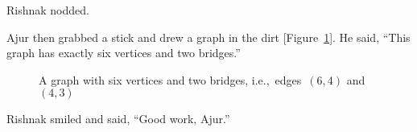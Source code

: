 Rishnak nodded.

Ajur then grabbed a stick and drew a graph in the dirt [Figure~\ref{14ag1}]. He said, ``This graph has exactly six vertices and two bridges.''

\begin{figure}
\begin{center}
\caption{A graph with six vertices and two bridges, i.e.,~edges~$(6,4)$ and~$(4,3)$}\label{14ag1}
\end{center}
\end{figure}

Rishnak smiled and said, ``Good work, Ajur.''
